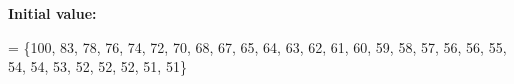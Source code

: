 {\bfseries Initial value\+:}
\begin{DoxyCode}
= \{100,    
                                              83,
                                              78,
                                              76,
                                              74,
                                              72,    
                                              70,
                                              68,
                                              67,
                                              65,
                                              64,    
                                              63,
                                              62,
                                              61,
                                              60,
                                              59,    
                                              58,
                                              57,
                                              56,
                                              56,
                                              55,    
                                              54,
                                              54,
                                              53,
                                              52,
                                              52,    
                                              52,
                                              51,
                                              51\}
\end{DoxyCode}
